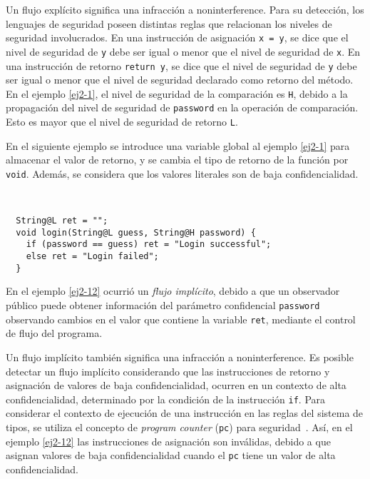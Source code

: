 Un flujo explícito significa una infracción a noninterference. Para su detección, los lenguajes de seguridad poseen distintas reglas que relacionan los niveles de seguridad involucrados. En una instrucción de asignación \texttt{x = y}, se dice que el nivel de seguridad de \texttt{y} debe ser igual o menor que el nivel de seguridad de \texttt{x}. En una instrucción de retorno \texttt{return y}, se dice que el nivel de seguridad de \texttt{y} debe ser igual o menor que el nivel de seguridad declarado como retorno del método. En el ejemplo \ref{ej2-1}, el nivel de seguridad de la comparación es \texttt{H}, debido a la propagación del nivel de seguridad de \texttt{password} en la operación de comparación. Esto es mayor que el nivel de seguridad de retorno \texttt{L}.

En el siguiente ejemplo se introduce una variable global al ejemplo \ref{ej2-1} para almacenar el valor de retorno, y se cambia el tipo de retorno de la función por \texttt{void}. Además, se considera que los valores literales son de baja confidencialidad.

\begin{ej} \ \\
  \normalfont
  \label{ej2-12}
\begin{lstlisting}
  String@L ret = "";
  void login(String@L guess, String@H password) {
    if (password == guess) ret = "Login successful";
    else ret = "Login failed";
  }
\end{lstlisting}
\end{ej}

En el ejemplo \ref{ej2-12} ocurrió un \emph{flujo implícito}, debido a que un observador público puede obtener información del parámetro confidencial \texttt{password} observando cambios en el valor que contiene la variable \texttt{ret}, mediante el control de flujo del programa.

Un flujo implícito también significa una infracción a noninterference. Es posible detectar un flujo implícito considerando que las instrucciones de retorno y asignación de valores de baja confidencialidad, ocurren en un contexto de alta confidencialidad, determinado por la condición de la instrucción \texttt{if}. Para considerar el contexto de ejecución de una instrucción en las reglas del sistema de tipos, se utiliza el concepto de \textit{program counter} (\texttt{pc}) para seguridad~\cite{pc}. Así, en el ejemplo \ref{ej2-12} las instrucciones de asignación son inválidas, debido a que asignan valores de baja confidencialidad cuando el \texttt{pc} tiene un valor de alta confidencialidad.

